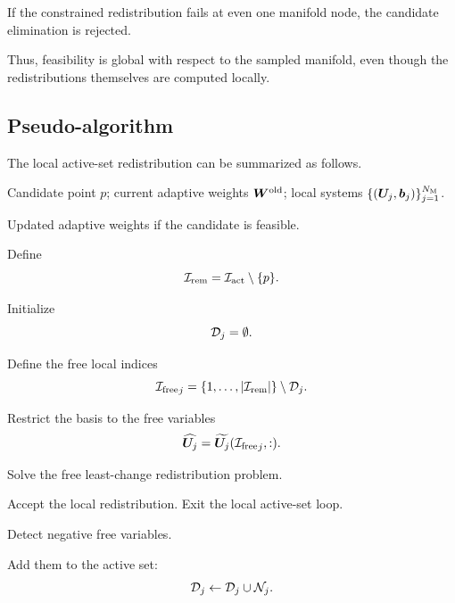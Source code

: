 \documentclass[11pt,a4paper]{article}
\begin{document}
If the constrained redistribution fails at even one manifold node, the
candidate elimination is rejected.

Thus, feasibility is global with respect to the sampled manifold, even though
the redistributions themselves are computed locally.

\subsection{Pseudo-algorithm}

The local active-set redistribution can be summarized as follows.

\begin{algorithm}[H]
\caption{Local positivity-enforcing redistribution}
\label{alg:local_active_set}
\begin{algorithmic}[1]

\Require
Candidate point $p$;
current adaptive weights $\bm W^{\mathrm{old}}$;
local systems $\{(\bm U_j,\bm b_j)\}_{j=1}^{N_{\mathrm{M}}}$.

\Ensure
Updated adaptive weights if the candidate is feasible.

\State Define
\[
        \mathcal{I}_{\mathrm{rem}}=\mathcal{I}_{\mathrm{act}}\setminus\{p\}.
\]


    \State Initialize
    \[
        \mathcal{D}_j=\emptyset.
    \]


        \State Define the free local indices
        \[
            {\mathcal{I}_{\mathrm{free}}}_j
            =
            \{1,\ldots,|\mathcal{I}_{\mathrm{rem}}|\}\setminus\mathcal{D}_j.
        \]

        \State Restrict the basis to the free variables
        \[
            \widehat{\bm U_j}
            =
            \widetilde{\bm U_j}({\mathcal{I}_{\mathrm{free}}}_j,:).
        \]

        \State Solve the free least-change redistribution problem.


            \State Accept the local redistribution.
            \State Exit the local active-set loop.

        \Else

            \State Detect negative free variables.

            \State Add them to the active set:
            \[
                \mathcal{D}_j
                \gets
                \mathcal{D}_j\cup\mathcal{N}_j.
            \]


\end{algorithmic}
\end{algorithm}
\end{document}
